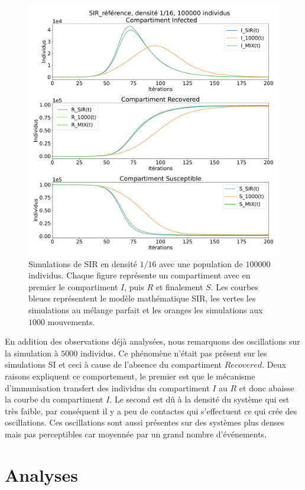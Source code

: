 \newpage

\begin{figure}[h]
	\centering
	\captionsetup{justification=centering}
	\includegraphics[width=.8\textwidth]{Images/SIR_ref_16_100.pdf}
	\caption[Simulation SIR, densité $1/16$]{Simulations de SIR en densité $1/16$ avec une population de $100000$ individus. Chaque figure représente un compartiment avec en premier le compartiment $I$, puis $R$ et finalement $S$. Les courbes bleues représentent le modèle mathématique SIR, les vertes les simulations au mélange parfait et les oranges les simulations aux $1000$ mouvements.}
\end{figure}

En addition des observations déjà analysées, nous remarquons des oscillations sur la simulation à $5000$ individus. Ce phénomène n'était pas présent sur les simulations SI et ceci à cause de l'absence du compartiment $Recovered$. Deux raisons expliquent ce comportement, le premier est que le mécanisme d'immunisation transfert des individus du compartiment $I$ au $R$ et donc abaisse la courbe du compartiment $I$. Le second est dû à la densité du système qui est très faible, par conséquent il y a peu de contactes qui s'effectuent ce qui crée des oscillations. Ces oscillations sont aussi présentes sur des systèmes plus denses mais pas perceptibles car moyennée par un grand nombre d'événements.

\newpage

\section{Analyses}

